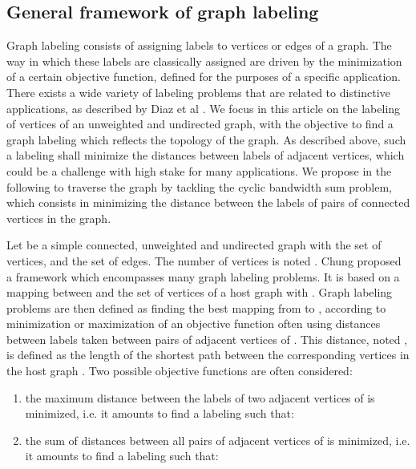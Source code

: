 \documentclass{scrartcl}
\theoremstyle{plain}
\begin{document}
\subsection{General framework of graph labeling}

Graph labeling consists of assigning labels to vertices or edges of a graph. The 
way in which these labels are classically assigned are driven by the 
minimization of a certain objective function, defined for the purposes of a 
specific application. There exists a wide variety of labeling problems that are 
related to distinctive applications, as described by Diaz et al \cite{Diaz2002}. 
We focus in this article on the labeling of vertices of an unweighted and 
undirected graph, with the objective to find a graph labeling which reflects the 
topology of the graph. As described above, such a labeling shall minimize the 
distances between labels of adjacent vertices, which could be a challenge with 
high stake for many applications. We propose in the following to traverse the 
graph by tackling the cyclic bandwidth sum problem, which consists in minimizing 
the distance between the labels of pairs of connected vertices in the graph.

Let  be a simple connected, unweighted and undirected graph with  
the set of vertices, and  the set of edges. The number of vertices is noted 
. Chung \cite{Chung1988} proposed a framework which encompasses many 
graph labeling problems. It is based on a mapping between  and the set of 
vertices of a host graph  with . Graph 
labeling problems are then defined as finding the best mapping  from  to 
, according to minimization or maximization of an objective function often 
using distances between labels taken between pairs of adjacent vertices of . 
This distance, noted , is defined as the length of the shortest path 
between the corresponding vertices in the host graph . Two possible objective 
functions are often considered:

\begin{enumerate}
\item the maximum distance  between the labels of two adjacent vertices of 
 is minimized, i.e. it amounts to find a labeling  such 
that:
  
\item the sum of distances  between all pairs of adjacent vertices of  
is minimized, i.e. it amounts to find a labeling  such that: 
  
\end{enumerate}
\end{document}
